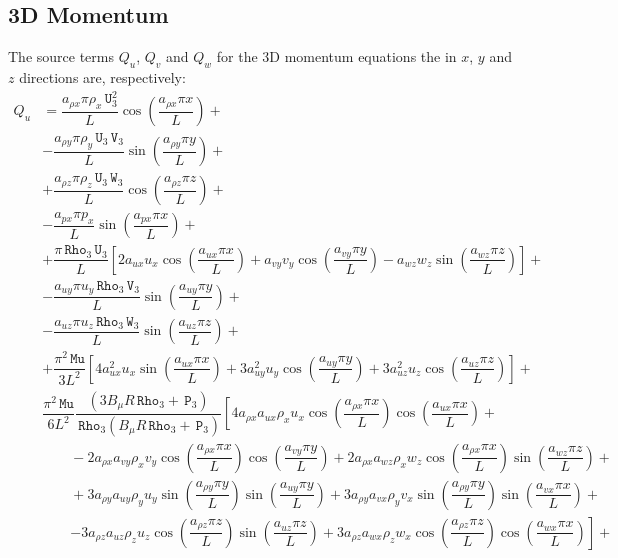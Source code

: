 \documentclass[10pt]{article}
\newcommand{\Rho}{\,\mathtt{Rho}}
\newcommand{\PP}{\,\mathtt{P}}
\newcommand{\U}{\,\mathtt{U}}
\newcommand{\V}{\,\mathtt{V}}
\newcommand{\W}{\,\mathtt{W}}
\newcommand{\MU}{\,\mathtt{Mu}}
\begin{document}
\subsection{3D Momentum}

The source terms $Q_{u}$, $Q_{v}$ and $Q_{w}$ for the 3D momentum equations the in $x$, $y$ and $z$ directions are, respectively:
%
\begin{equation}
 \begin{split}
Q_u &= \dfrac{a_{\rho x} \pi \rho_x \U_3^2 }{L}\cos\left(\dfrac{a_{\rho x} \pi x}{L}\right)+\\
&-\dfrac{a_{\rho y} \pi \rho_y \U_3 \V_3 }{L}\sin\left(\dfrac{a_{\rho y} \pi y}{L}\right)+\\
&+\dfrac{a_{\rho z} \pi \rho_z \U_3 \W_3 }{L}\cos\left(\dfrac{a_{\rho z}\pi z }{L}\right)+\\
&-\dfrac{a_{px} \pi p_x }{L}\sin\left(\dfrac{a_{px} \pi x}{L}\right)+\\
&+\dfrac{\pi \Rho_3 \U_3}{L}\left[2 a_{ux} u_x \cos\left(\dfrac{a_{ux} \pi x}{L}\right)+a_{vy} v_y \cos\left(\dfrac{a_{vy} \pi y}{L}\right)-a_{wz} w_z \sin\left(\dfrac{a_{wz}\pi z }{L}\right)\right]+\\
&-\dfrac{a_{uy} \pi u_y \Rho_3 \V_3}{L} \sin\left(\dfrac{a_{uy} \pi y}{L}\right)+\\
&-\dfrac{a_{uz} \pi u_z \Rho_3 \W_3 }{L}\sin\left(\dfrac{a_{uz}\pi z }{L}\right)+\\
&+\dfrac{ \pi^2 \MU }{3L^2}  \left[4 a_{ux}^2 u_x \sin\left(\dfrac{a_{ux} \pi x}{L}\right)+3 a_{uy}^2 u_y \cos\left(\dfrac{a_{uy} \pi y}{L}\right)+3 a_{uz}^2 u_z \cos\left(\dfrac{a_{uz} \pi z}{L}\right)\right] +\\
%
&\dfrac{ \pi^2 \MU}{6L^2}\dfrac{(3 B_\mu R \Rho_3+\PP_3) }{\Rho_3 (B_\mu R \Rho_3+\PP_3) }\left[4 a_{\rho x} a_{ux} \rho_x u_x \cos\left(\dfrac{a_{\rho x} \pi x}{L}\right) \cos\left(\dfrac{a_{ux} \pi x}{L}\right)\right.+\\
    &\qquad-2 a_{\rho x} a_{vy} \rho_x v_y \cos\left(\dfrac{a_{\rho x} \pi x}{L}\right) \cos\left(\dfrac{a_{vy} \pi y}{L}\right)+2 a_{\rho x} a_{wz} \rho_x w_z \cos\left(\dfrac{a_{\rho x} \pi x}{L}\right) \sin\left(\dfrac{a_{wz} \pi z}{L}\right)+\\
    &\qquad+3 a_{\rho y} a_{uy} \rho_y u_y \sin\left(\dfrac{a_{\rho y} \pi y}{L}\right) \sin\left(\dfrac{a_{uy} \pi y}{L}\right)+3 a_{\rho y} a_{vx} \rho_y v_x \sin\left(\dfrac{a_{\rho y} \pi y}{L}\right) \sin\left(\dfrac{a_{vx} \pi x}{L}\right)+\\
    &\qquad\left.-3 a_{\rho z} a_{uz} \rho_z u_z \cos\left(\dfrac{a_{\rho z} \pi z}{L}\right) \sin\left(\dfrac{a_{uz} \pi z}{L}\right)+3 a_{\rho z} a_{wx} \rho_z w_x \cos\left(\dfrac{a_{\rho z} \pi z}{L}\right) \cos\left(\dfrac{a_{wx} \pi x}{L}\right)\right]   +\\

\end{split}
\end{equation}
\end{document}
